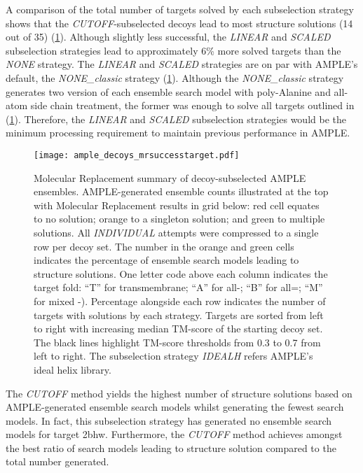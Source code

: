 A comparison of the total number of targets solved by each subselection strategy shows that the \textit{CUTOFF}-subselected decoys lead to most structure solutions (14 out of 35) (\cref{fig:ample_decoys_mrsuccesstarget}). Although slightly less successful, the \textit{LINEAR} and \textit{SCALED} subselection strategies lead to approximately 6\% more solved targets than the \textit{NONE} strategy. The \textit{LINEAR} and \textit{SCALED} strategies are on par with AMPLE's default, the \textit{NONE\_classic} strategy (\cref{fig:ample_decoys_mrsuccesstarget}). Although the \textit{NONE\_classic} strategy generates two version of each ensemble search model with poly-Alanine and all-atom side chain treatment, the former was enough to solve all targets outlined in (\cref{fig:ample_decoys_mrsuccesstarget}). Therefore, the \textit{LINEAR} and \textit{SCALED} subselection strategies would be the minimum processing requirement to maintain previous performance in AMPLE.

\begin{figure}[H]
    \centering
    \texttt{[image: ample\_decoys\_mrsuccesstarget.pdf]}
\caption[Molecular Replacement summary of decoy-subselected AMPLE ensembles]{Molecular Replacement summary of decoy-subselected AMPLE ensembles. AMPLE-generated ensemble counts illustrated at the top with Molecular Replacement results in grid below: red cell equates to no solution; orange to a singleton solution; and green to multiple solutions. All \textit{INDIVIDUAL} attempts were compressed to a single row per decoy set. The number in the orange and green cells indicates the percentage of ensemble search models leading to structure solutions. One letter code above each column indicates the target fold: ``T'' for transmembrane; ``A'' for all-\textalpha; ``B'' for all=\textbeta; ``M'' for mixed \textalpha-\textbeta). Percentage alongside each row indicates the number of targets with solutions by each strategy. Targets are sorted from left to right with increasing median TM-score of the starting decoy set. The black lines highlight TM-score thresholds from 0.3 to 0.7 from left to right. The subselection strategy \textit{IDEALH} refers AMPLE's ideal helix library.}
    \label{fig:ample_decoys_mrsuccesstarget}
\end{figure}

The \textit{CUTOFF} method yields the highest number of structure solutions based on AMPLE-generated ensemble search models whilst generating the fewest search models. In fact, this subselection strategy has generated no ensemble search models for target 2bhw. Furthermore, the \textit{CUTOFF} method achieves amongst the best ratio of search models leading to structure solution compared to the total number generated. 

